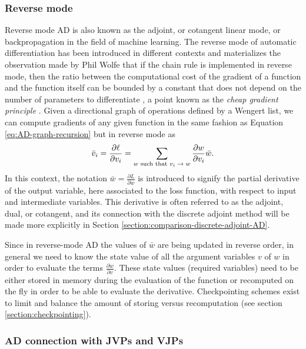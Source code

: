 \subsubsection{Reverse mode}

Reverse mode AD is also known as the adjoint, or cotangent linear mode, or backpropagation in the field of machine learning. 
The reverse mode of automatic differentiation has been introduced in different contexts \cite{griewank2012invented} and materializes the observation made by Phil Wolfe that if the chain rule is implemented in reverse mode, then the ratio between the computational cost of the gradient of a function and the function itself can be bounded by a constant that does not depend on the number of parameters to differentiate \cite{Griewank_1989, Wolfe_1982}, a point known as the \textit{cheap gradient principle} \cite{griewank2012invented}.  
Given a directional graph of operations defined by a Wengert list, we can compute gradients of any given function in the same fashion as Equation \eqref{eq:AD-graph-recursion} but in reverse mode as
\begin{equation}
    \bar v_i 
    = 
    \frac{\partial \ell}{\partial v_i}
    = 
    \sum_\text{$w$\text{ such that} $v_i \rightarrow w$}
    \frac{\partial w}{\partial v_i} \bar{w}.
    \label{eq:reverse-mode-ad-definition}
\end{equation}
In this context, the notation $\bar{w} = \frac{\partial L}{\partial w}$ is introduced to signify the partial derivative of the output variable, here associated to the loss function, with respect to input and intermediate variables. 
This derivative is often referred to as the adjoint, dual, or cotangent, and its connection with the discrete adjoint method will be made more explicitly in Section \ref{section:comparison-discrete-adjoint-AD}. 

Since in reverse-mode AD the values of $\bar w$ are being updated in reverse order, in general
we need to know the state value of all the argument variables $v$ of $w$ in order to evaluate the terms $\frac{\partial w}{\partial v}$.
These state values (required variables) need to be either stored in memory during the evaluation of the function or recomputed on the fly in order to be able to evaluate the derivative. 
Checkpointing schemes exist to limit and balance the amount of storing versus recomputation (see section \ref{section:checkpointing}).


\subsubsection{AD connection with JVPs and VJPs}
\label{sec:vjp-jvp}

